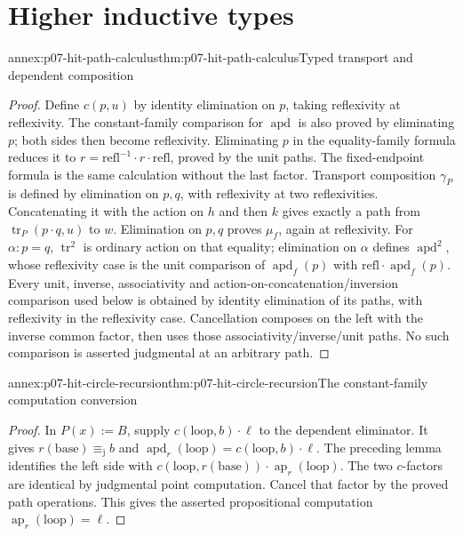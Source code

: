 \section{Higher inductive types}

\begin{annexitem}{annex:p07-hit-path-calculus}{thm:p07-hit-path-calculus}{Typed transport and dependent composition}
\begin{proof}
Define \(c(p,u)\) by identity elimination on \(p\), taking reflexivity
at reflexivity. The constant-family comparison for \(\operatorname{apd}\)
is also proved by eliminating \(p\); both sides then become reflexivity.
Eliminating \(p\) in the equality-family formula reduces it to
\(r=\mathrm{refl}^{-1}\cdot r\cdot\mathrm{refl}\), proved by the unit
paths. The fixed-endpoint formula is the same calculation without the last
factor. Transport composition \(\gamma_P\) is defined by elimination on
\(p,q\), with reflexivity at two reflexivities. Concatenating it with the
action on \(h\) and then \(k\) gives exactly a path from
\(\operatorname{tr}_P(p\cdot q,u)\) to \(w\). Elimination on
\(p,q\) proves \(\mu_f\), again at reflexivity. For \(\alpha:p=q\),
\(\operatorname{tr}^2\) is ordinary action on that equality;
elimination on \(\alpha\) defines \(\operatorname{apd}^2\), whose
reflexivity case is the unit comparison of \(\operatorname{apd}_f(p)\)
with \(\mathrm{refl}\cdot\operatorname{apd}_f(p)\).
Every unit, inverse, associativity and action-on-concatenation/inversion
comparison used below is obtained by identity elimination of its paths,
with reflexivity in the reflexivity case. Cancellation composes on the left
with the inverse common factor, then uses those associativity/inverse/unit
paths. No such comparison is asserted judgmental at an arbitrary path.
\end{proof}
\end{annexitem}

\begin{annexitem}{annex:p07-hit-circle-recursion}{thm:p07-hit-circle-recursion}{The constant-family computation conversion}
\begin{proof}
In \(P(x):=B\), supply \(c(\mathrm{loop},b)\cdot\ell\) to the
dependent eliminator. It gives \(r(\mathrm{base})\equiv_{\mathrm j}b\)
and \(\operatorname{apd}_r(\mathrm{loop})=c(\mathrm{loop},b)\cdot\ell\).
The preceding lemma identifies the left side with
\(c(\mathrm{loop},r(\mathrm{base}))\cdot\operatorname{ap}_r(\mathrm{loop})\).
The two \(c\)-factors are identical by judgmental point computation.
Cancel that factor by the proved path operations. This gives the asserted
propositional computation \(\operatorname{ap}_r(\mathrm{loop})=\ell\).
\end{proof}
\end{annexitem}

